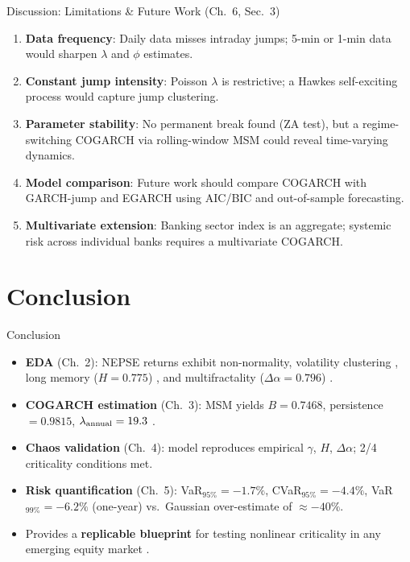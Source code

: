 \documentclass[10pt, aspectratio=169]{beamer}
\begin{document}
\begin{frame}{Discussion: Limitations \& Future Work (Ch.\ 6, Sec.\ 3)}
\begin{enumerate}
  \item \textbf{Data frequency}: Daily data misses intraday jumps;
        5-min or 1-min data would sharpen $\lambda$ and $\phi$ estimates.
  \item \textbf{Constant jump intensity}: Poisson $\lambda$ is
        restrictive; a \alert{Hawkes self-exciting process}
        \cite{hardiman2013critical} would capture jump clustering.
  \item \textbf{Parameter stability}: No permanent break found (ZA test),
        but a \alert{regime-switching COGARCH} via rolling-window MSM
        could reveal time-varying dynamics.
  \item \textbf{Model comparison}: Future work should compare COGARCH
        with GARCH-jump and EGARCH using AIC/BIC and out-of-sample
        forecasting.
  \item \textbf{Multivariate extension}: Banking sector index is an
        aggregate; systemic risk across individual banks requires a
        multivariate COGARCH.
\end{enumerate}
\end{frame}

\section{Conclusion}

\begin{frame}{Conclusion}
\begin{itemize}
  \item \textbf{EDA} (Ch.\ 2): NEPSE returns exhibit non-normality,
        volatility clustering \cite{bollerslev1986generalized},
        long memory ($H=0.775$) \cite{peters1994fractal},
        and multifractality ($\Delta\alpha=0.796$)
        \cite{calvet2002multifractality}.
  \item \textbf{COGARCH estimation} (Ch.\ 3): MSM yields $B=0.7468$,
        persistence $=0.9815$, $\lambda_{\rm annual}=19.3$
        \cite{kluppelberg2004continuous}.
  \item \textbf{Chaos validation} (Ch.\ 4): model reproduces empirical
        $\gamma$, $H$, $\Delta\alpha$; 2/4 criticality conditions met.
  \item \textbf{Risk quantification} (Ch.\ 5):
        VaR$_{95\%}=-1.7\%$, CVaR$_{95\%}=-4.4\%$,
        VaR$_{99\%}=-6.2\%$ (one-year) vs.\ Gaussian
        over-estimate of $\approx -40\%$.
  \item Provides a \textbf{replicable blueprint} for testing nonlinear
        criticality in any emerging equity market
        \cite{worldbank2020nepal,gajurel2021volatility}.
\end{itemize}
\end{frame}
\end{document}
